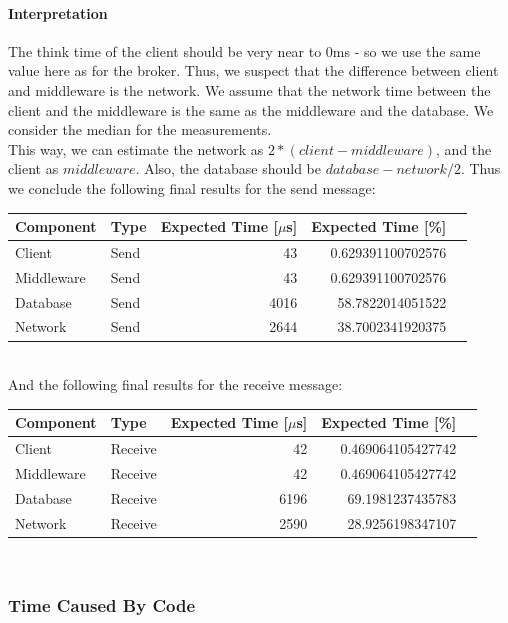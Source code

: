 \documentclass[milestone1.tex]{subfiles}
\begin{document}
\paragraph{Interpretation} The think time of the client should be very near to 0ms - so we use the same value here as for the broker. Thus, we suspect that the difference between client and middleware is the network. We assume that the network time between the client and the middleware is the same as the middleware and the database.  We consider the median for the measurements.\\
This way, we can estimate the network as $2*(client-middleware)$, and the client as $middleware$. Also, the database should be $database-network/2$.
Thus we conclude the following final results for the send message:\\

\begin{tabular}{|l|l|r|r|r|}
\hline
\textbf{Component} & \textbf{Type} & \textbf{Expected Time [$\mu$s]} & \textbf{Expected Time [\%]} \\ \hline
Client & Send & 43 & 0.629391100702576 \\ \hline
Middleware & Send & 43 & 0.629391100702576 \\ \hline
Database & Send & 4016 & 58.7822014051522 \\ \hline
Network & Send & 2644 & 38.7002341920375 \\ \hline
\end{tabular}
\\

\noindent And the following final results for the receive message:\\

\begin{tabular}{|l|l|r|r|r|}
\hline
\textbf{Component} & \textbf{Type} & \textbf{Expected Time [$\mu$s]} & \textbf{Expected Time [\%]} \\ \hline
Client & Receive & 42 & 0.469064105427742 \\ \hline
Middleware & Receive & 42 & 0.469064105427742 \\ \hline
Database & Receive & 6196 & 69.1981237435783 \\ \hline
Network & Receive & 2590 & 28.9256198347107 \\ \hline
\end{tabular}
\\



\subsubsection{Time Caused By Code}
\end{document}
